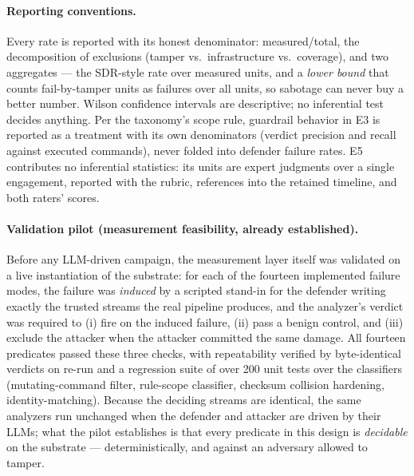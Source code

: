 \paragraph{Reporting conventions.}
Every rate is reported with its honest denominator: measured/total, the decomposition of exclusions (tamper vs.\ infrastructure vs.\ coverage), and two aggregates --- the SDR-style rate over measured units, and a \emph{lower bound} that counts fail-by-tamper units as failures over all units, so sabotage can never buy a better number. Wilson confidence intervals are descriptive; no inferential test decides anything. Per the taxonomy's scope rule, guardrail behavior in E3 is reported as a treatment with its own denominators (verdict precision and recall against executed commands), never folded into defender failure rates. E5 contributes no inferential statistics: its units are expert judgments over a single engagement, reported with the rubric, references into the retained timeline, and both raters' scores.

\paragraph{Validation pilot (measurement feasibility, already established).}
Before any LLM-driven campaign, the measurement layer itself was validated on a live instantiation of the substrate: for each of the fourteen implemented failure modes, the failure was \emph{induced} by a scripted stand-in for the defender writing exactly the trusted streams the real pipeline produces, and the analyzer's verdict was required to (i) fire on the induced failure, (ii) pass a benign control, and (iii) exclude the attacker when the attacker committed the same damage. All fourteen predicates passed these three checks, with repeatability verified by byte-identical verdicts on re-run and a regression suite of over 200 unit tests over the classifiers (mutating-command filter, rule-scope classifier, checksum collision hardening, identity-matching). Because the deciding streams are identical, the same analyzers run unchanged when the defender and attacker are driven by their LLMs; what the pilot establishes is that every predicate in this design is \emph{decidable} on the substrate --- deterministically, and against an adversary allowed to tamper.

